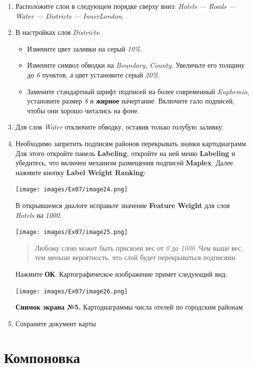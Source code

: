 \documentclass[12pt,]{book}
\begin{document}
\begin{enumerate}
\def\labelenumi{\arabic{enumi}.}
\item
  Расположите слои в следующем порядке сверху вниз: \emph{Hotels --- Roads --- Water --- Districts --- InnerLondon}.
\item
  В настройках слоя \emph{Districts}:

  \begin{itemize}
  \item
    Измените цвет заливки на серый \emph{10\%}.
  \item
    Измените символ обводки на \emph{Boundary, County}. Увеличьте его толщину до \emph{6} пунктов, а цвет установите серый \emph{20\%}.
  \item
    Замените стандартный шрифт подписей на более современный \emph{Euphemia}, установите размер \emph{8} и \textbf{жирное} начертание. Включите гало подписей, чтобы они хорошо читались на фоне.
  \end{itemize}
\item
  Для слоя \emph{Water} отключите обводку, оставив только голубую заливку.
\item
  Необходимо запретить подписям районов перекрывать значки картодиаграмм. Для этого откройте панель \textbf{Labeling}, откройте на ней меню \textbf{Labeling} и убедитесь, что включен механизм размещения подписей \textbf{Maplex}. Далее нажмите кнопку \textbf{Label Weight Ranking}:

  \texttt{[image: images/Ex07/image24.png]}

  В открывшемся диалоге исправьте значение \textbf{Feature Weight} для слоя
  \emph{Hotels} на \emph{1000}.

  \texttt{[image: images/Ex07/image25.png]}

  \begin{quote}
  Любому слою может быть присвоен вес от \emph{0} до \emph{1000}. Чем выше вес, тем меньше вероятность, что слой будет перекрываться подписями.
  \end{quote}

  Нажмите \textbf{ОК}. Картографическое изображение примет следующий вид:

  \texttt{[image: images/Ex07/image26.png]}

  \textbf{Снимок экрана №5.} Картодиаграммы числа отелей по городским районам
\item
  Сохраните документ карты
\end{enumerate}

\hypertarget{map-ref-economic-layout}{%
\section{Компоновка}\label{map-ref-economic-layout}}
\end{document}
